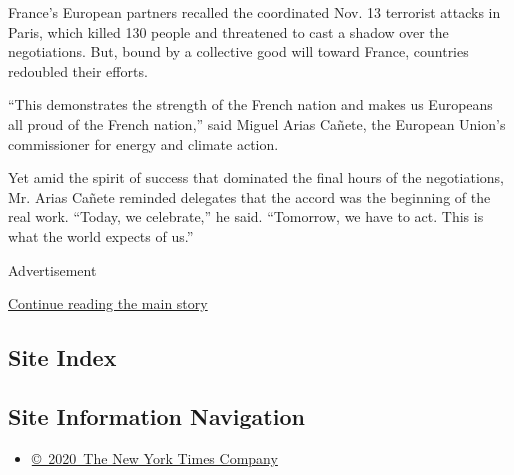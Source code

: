 France's European partners recalled the coordinated Nov. 13 terrorist
attacks in Paris, which killed 130 people and threatened to cast a
shadow over the negotiations. But, bound by a collective good will
toward France, countries redoubled their efforts.

``This demonstrates the strength of the French nation and makes us
Europeans all proud of the French nation,'' said Miguel Arias Cañete,
the European Union's commissioner for energy and climate action.

Yet amid the spirit of success that dominated the final hours of the
negotiations, Mr. Arias Cañete reminded delegates that the accord was
the beginning of the real work. ``Today, we celebrate,'' he said.
``Tomorrow, we have to act. This is what the world expects of us.''

Advertisement

\protect\hyperlink{after-bottom}{Continue reading the main story}

\hypertarget{site-index}{%
\subsection{Site Index}\label{site-index}}

\hypertarget{site-information-navigation}{%
\subsection{Site Information
Navigation}\label{site-information-navigation}}

\begin{itemize}
\tightlist
\item
  \href{https://help.nytimes.com/hc/en-us/articles/115014792127-Copyright-notice}{©~2020~The
  New York Times Company}
\end{itemize}

